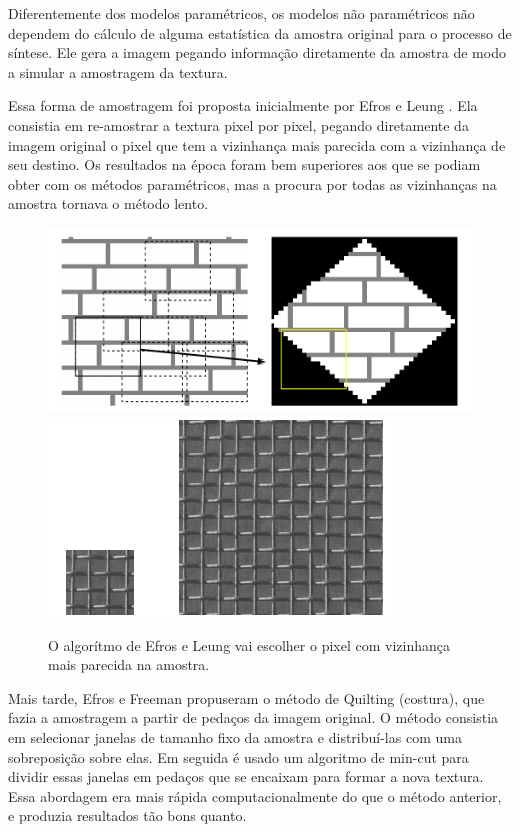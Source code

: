 Diferentemente dos modelos paramétricos,
os modelos não paramétricos não dependem
do cálculo de alguma
estatística da amostra original para
o processo de síntese. Ele gera a imagem
pegando informação diretamente da
amostra de modo a simular a amostragem
da textura.

Essa forma de amostragem foi proposta
inicialmente por Efros e Leung \cite{Efros1999}.
Ela consistia em re-amostrar a textura
pixel por pixel, pegando diretamente
da imagem original o pixel que tem
a vizinhança mais parecida com a vizinhança
de seu destino. Os resultados na época
foram bem superiores aos que se podiam
obter com os métodos paramétricos,
mas a procura por todas as vizinhanças
na amostra tornava o método lento.

\begin{figure}[!ht]
	\centering
	\includegraphics[width=\linewidth*2/3]{files/assets/articles/efros3.png}
	\includegraphics[width=\linewidth*5/6]{files/assets/articles/efros1.png}
	\caption{O algorítmo de Efros e Leung vai escolher o pixel
	com vizinhança mais parecida na amostra.}
	\label{img:preview}
\end{figure}

Mais tarde, Efros e Freeman \cite{Efros2001}
propuseram o método de Quilting (costura),
que fazia a amostragem a partir
de pedaços da imagem original. 
O método consistia em selecionar
janelas de tamanho fixo da amostra
e distribuí-las com uma sobreposição
sobre elas. Em seguida é usado
um algoritmo de min-cut para dividir
essas janelas em pedaços que se encaixam
para formar a nova textura.
Essa abordagem era mais rápida 
computacionalmente do que o método
anterior, e produzia resultados
tão bons quanto.

